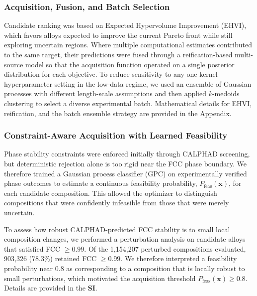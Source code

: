 \documentclass[preprint,12pt,times]{elsarticle}  %
\begin{document}
\subsubsection{Acquisition, Fusion, and Batch Selection}

Candidate ranking was based on Expected Hypervolume Improvement (EHVI), which favors alloys expected to improve the current Pareto front while still exploring uncertain regions. Where multiple computational estimates contributed to the same target, their predictions were fused through a reification-based multi-source model so that the acquisition function operated on a single posterior distribution for each objective. To reduce sensitivity to any one kernel hyperparameter setting in the low-data regime, we used an ensemble of Gaussian processes with different length-scale assumptions and then applied $k$-medoids clustering to select a diverse experimental batch. Mathematical details for EHVI, reification, and the batch ensemble strategy are provided in the Appendix.

\subsubsection{Constraint-Aware Acquisition with Learned Feasibility}

Phase stability constraints were enforced initially through CALPHAD screening, but deterministic rejection alone is too rigid near the FCC phase boundary. We therefore trained a Gaussian process classifier (GPC) on experimentally verified phase outcomes to estimate a continuous feasibility probability, $P_\text{feas}(\mathbf{x})$, for each candidate composition. This allowed the optimizer to distinguish compositions that were confidently infeasible from those that were merely uncertain.

To assess how robust CALPHAD-predicted FCC stability is to small local composition changes, we performed a perturbation analysis on candidate alloys that satisfied FCC $\geq 0.99$. Of the 1,154,207 perturbed compositions evaluated, 903,326 (78.3\%) retained FCC $\geq 0.99$. We therefore interpreted a feasibility probability near 0.8 as corresponding to a composition that is locally robust to small perturbations, which motivated the acquisition threshold $P_\text{feas}(\mathbf{x}) \geq 0.8$. Details are provided in the \textbf{SI}.
\end{document}
